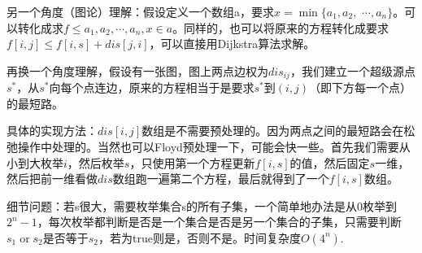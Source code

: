 \documentclass{article}
\DeclareMathOperator{\bor}{or}
\begin{document}
另一个角度（图论）理解：假设定义一个数组a，要求$x=\min\{a_1,a_2,$ $\cdots,a_n\}$。可以转化成求$f\le a_1,a_2,\cdots,a_n,x\in a$。同样的，也可以将原来的方程转化成要求$f[i,j]\le f[i,s]+dis[j,i]$，可以直接用Dijkstra算法求解。

再换一个角度理解，假设有一张图，图上两点边权为$dis_{ij}$，我们建立一个超级源点$s^*$，从$s^*$向每个点连边，原来的方程相当于是要求$s^*$到$(i,j)$（即下方每一个点）的最短路。

具体的实现方法：$dis[i,j]$数组是不需要预处理的。因为两点之间的最短路会在松弛操作中处理的。当然也可以Floyd预处理一下，可能会快一些。首先我们需要从小到大枚举$i$，然后枚举$s$，只使用第一个方程更新$f[i,s]$的值，然后固定$s$一维，然后把前一维看做$dis$数组跑一遍第二个方程，最后就得到了一个$f[i,s]$数组。

细节问题：若s很大，需要枚举集合s的所有子集，一个简单地办法是从0枚举到$2^n-1$，每次枚举都判断是否是一个集合是否是另一个集合的子集，只需要判断$s_1\bor s_2$是否等于$s_2$，若为true则是，否则不是。时间复杂度$O(4^n)$.
\end{document}
